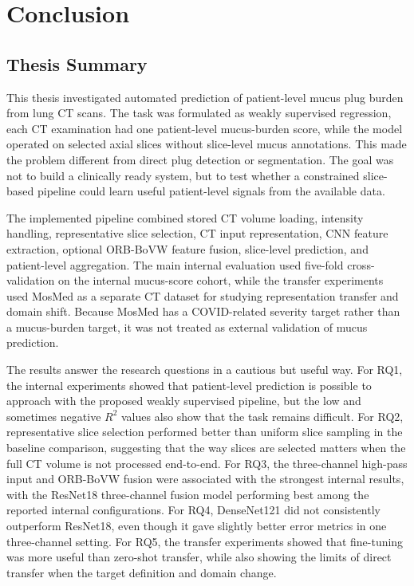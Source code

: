 \chapter{Conclusion}


\section{Thesis Summary}
This thesis investigated automated prediction of patient-level mucus plug burden from lung CT scans. The task was formulated as weakly supervised regression, each CT examination had one patient-level mucus-burden score, while the model operated on selected axial slices without slice-level mucus annotations. This made the problem different from direct plug detection or segmentation. The goal was not to build a clinically ready system, but to test whether a constrained slice-based pipeline could learn useful patient-level signals from the available data.

The implemented pipeline combined stored CT volume loading, intensity handling, representative slice selection, CT input representation, CNN feature extraction, optional ORB-BoVW feature fusion, slice-level prediction, and patient-level aggregation. The main internal evaluation used five-fold cross-validation on the internal mucus-score cohort, while the transfer experiments used MosMed as a separate CT dataset for studying representation transfer and domain shift. Because MosMed has a COVID-related severity target rather than a mucus-burden target, it was not treated as external validation of mucus prediction.

The results answer the research questions in a cautious but useful way. For RQ1, the internal experiments showed that patient-level prediction is possible to approach with the proposed weakly supervised pipeline, but the low and sometimes negative \(R^2\) values also show that the task remains difficult. For RQ2, representative slice selection performed better than uniform slice sampling in the baseline comparison, suggesting that the way slices are selected matters when the full CT volume is not processed end-to-end. For RQ3, the three-channel high-pass input and ORB-BoVW fusion were associated with the strongest internal results, with the ResNet18 three-channel fusion model performing best among the reported internal configurations. For RQ4, DenseNet121 did not consistently outperform ResNet18, even though it gave slightly better error metrics in one three-channel setting. For RQ5, the transfer experiments showed that fine-tuning was more useful than zero-shot transfer, while also showing the limits of direct transfer when the target definition and domain change.

